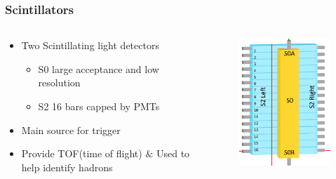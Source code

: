 \documentclass{beamer}
\begin{document}

\begin{frame}
\frametitle{Scintillators}
\vspace{-8pt}
	\begin{columns}
		\begin{block}{}
			\begin{itemize}
				\item Two Scintillating light detectors
				\begin{itemize}
					\item S0 large acceptance and low resolution
					\item S2 16 bars capped by PMTs
				\end{itemize}
				\item Main source for trigger
				\item Provide TOF(time of flight) $\&$ Used to help identify hadrons \cite{nim}
			\end{itemize}
		
		\end{block}
		\begin{figure}
			\includegraphics[width=5cm]{../images/Scins}
		\end{figure}
	\end{columns}
\end{frame}
\end{document}
